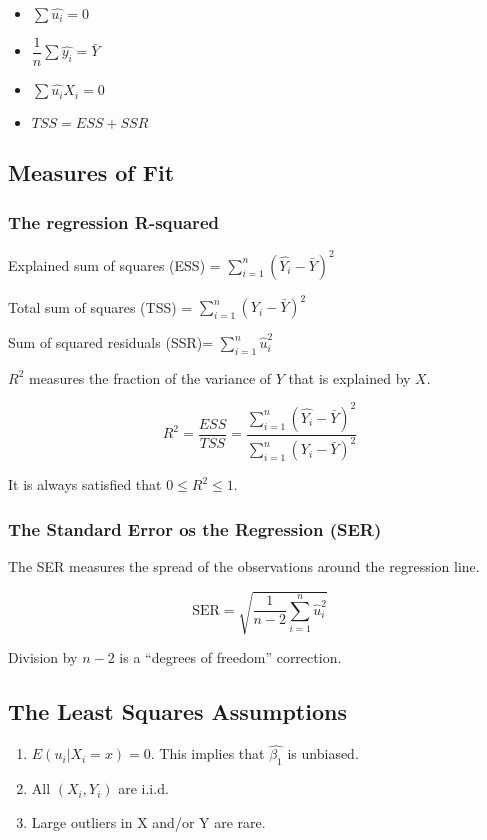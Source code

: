 \documentclass{article}
\newcommand{\sumlimits}{\sum \limits _{i=1}^{n}}
\begin{document}
\begin{itemize}
	\item $\sum \hat{u_i} = 0$
	\item $\dfrac{1}{n} \sum \hat{y_i} = \bar{Y}$
	\item $\sum \hat{u_i}X_i = 0$
	\item $TSS = ESS + SSR$
\end{itemize}

\subsection{Measures of Fit}

\subsubsection{The regression R-squared}

Explained sum of squares (ESS) = $\sumlimits \left(\hat{Y_i} - \bar{Y}\right)^2$

Total sum of squares (TSS) = $\sumlimits \left(Y_i - \bar{Y}\right)^2$

Sum of squared residuals (SSR)= $\sumlimits \hat{u}_i^2$

$R^2$ measures the fraction of the variance of $Y$ that is explained by $X$.

\[
	R^2 = \dfrac{ESS}{TSS} = \dfrac{
		\sumlimits (\hat{Y_i} - \bar{Y})^2
	}{
		\sumlimits (Y_i - \bar{Y})^2
	}
\]

It is always satisfied that $0 \leq R^2 \leq 1$.

\subsubsection{The Standard Error os the Regression (SER)}

The SER measures the spread of the observations around the regression line.

\[
	\text{SER} = \sqrt{
		\dfrac{1}{n-2}
		\sumlimits \hat{u}_i^2
	}
\]

Division by $n-2$ is a ``degrees of freedom'' correction.

\subsection{The Least Squares Assumptions}

\begin{enumerate}
	\item $E(u_i | X_i = x) = 0$. This implies that $\hat{\beta_1}$ is unbiased.
	\item	All $(X_i, Y_i)$ are i.i.d.
	\item Large outliers in X and/or Y are rare.
\end{enumerate}
\end{document}
